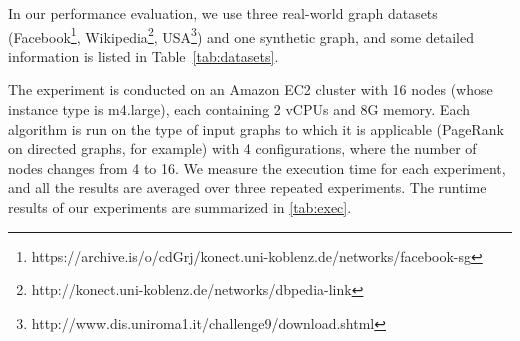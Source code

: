 \documentclass{sokendai_thesis} %
\begin{document}
\begin{table}[t]
 \centering
 \caption{Datasets for performance evaluation}
 \label{tab:datasets}
\end{table}

In our performance evaluation, we use three real-world graph datasets (Facebook\footnote{https://archive.is/o/cdGrj/konect.uni-koblenz.de/networks/facebook-sg}, Wikipedia\footnote{http://konect.uni-koblenz.de/networks/dbpedia-link}, USA\footnote{http://www.dis.uniroma1.it/challenge9/download.shtml}) and one synthetic graph, and some detailed information is listed in Table~\ref{tab:datasets}.

The experiment is conducted on an Amazon EC2 cluster with 16 nodes (whose instance type is m4.large), each containing 2 vCPUs and 8G memory.
Each algorithm is run on the type of input graphs to which it is applicable (PageRank on directed graphs, for example) with 4 configurations, where the number of nodes changes from 4 to 16.
We measure the execution time for each experiment, and all the results are averaged over three repeated experiments.
The runtime results of our experiments are summarized in \autoref{tab:exec}.
\end{document}
